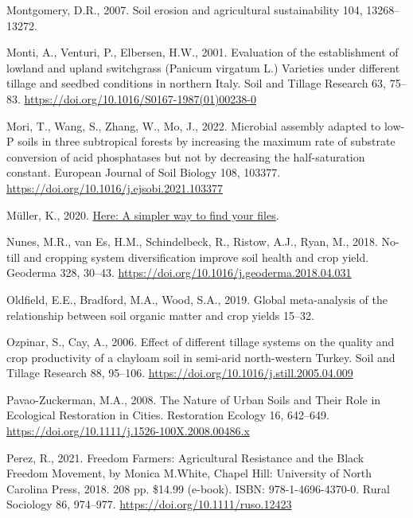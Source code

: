 \documentclass[
  12pt,
]{article}
\newlength{\cslhangindent}
\newlength{\cslentryspacingunit} %
\newenvironment{CSLReferences}[2] %
 {%
  \setlength{\parindent}{0pt}
  \ifodd #1
  \let\oldpar\par
  \def\par{\hangindent=\cslhangindent\oldpar}
  \fi
  \setlength{\parskip}{#2\cslentryspacingunit}
 }%
 {}
\begin{document}
\begin{CSLReferences}{1}{0}
\leavevmode{}%
Montgomery, D.R., 2007. Soil erosion and agricultural sustainability 104, 13268--13272.

\leavevmode{}%
Monti, A., Venturi, P., Elbersen, H.W., 2001. Evaluation of the establishment of lowland and upland switchgrass ({Panicum} virgatum {L}.) Varieties under different tillage and seedbed conditions in northern {Italy}. Soil and Tillage Research 63, 75--83. \url{https://doi.org/10.1016/S0167-1987(01)00238-0}

\leavevmode{}%
Mori, T., Wang, S., Zhang, W., Mo, J., 2022. Microbial assembly adapted to low-{P} soils in three subtropical forests by increasing the maximum rate of substrate conversion of acid phosphatases but not by decreasing the half-saturation constant. European Journal of Soil Biology 108, 103377. \url{https://doi.org/10.1016/j.ejsobi.2021.103377}

\leavevmode{}%
Müller, K., 2020. \href{https://CRAN.R-project.org/package=here}{Here: A simpler way to find your files}.

\leavevmode{}%
Nunes, M.R., van Es, H.M., Schindelbeck, R., Ristow, A.J., Ryan, M., 2018. No-till and cropping system diversification improve soil health and crop yield. Geoderma 328, 30--43. \url{https://doi.org/10.1016/j.geoderma.2018.04.031}

\leavevmode{}%
Oldfield, E.E., Bradford, M.A., Wood, S.A., 2019. Global meta-analysis of the relationship between soil organic matter and crop yields 15--32.

\leavevmode{}%
Ozpinar, S., Cay, A., 2006. Effect of different tillage systems on the quality and crop productivity of a clay\textendash loam soil in semi-arid north-western {Turkey}. Soil and Tillage Research 88, 95--106. \url{https://doi.org/10.1016/j.still.2005.04.009}

\leavevmode{}%
Pavao-Zuckerman, M.A., 2008. The {Nature} of {Urban Soils} and {Their Role} in {Ecological Restoration} in {Cities}. Restoration Ecology 16, 642--649. \url{https://doi.org/10.1111/j.1526-100X.2008.00486.x}

\leavevmode{}%
Perez, R., 2021. Freedom {Farmers}: {Agricultural Resistance} and the {Black Freedom Movement}, by {Monica M}.{White}, {Chapel Hill}: {University} of {North Carolina Press}, 2018. 208 pp. \$14.99 (e-book). {ISBN}: 978-1-4696-4370-0. Rural Sociology 86, 974--977. \url{https://doi.org/10.1111/ruso.12423}


\end{CSLReferences}
\end{document}
